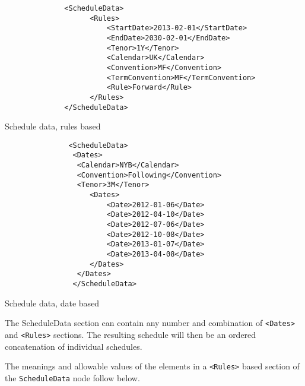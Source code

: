 \begin{listing}[H]
\begin{verbatim}
              <ScheduleData>
                    <Rules>
                        <StartDate>2013-02-01</StartDate>
                        <EndDate>2030-02-01</EndDate>
                        <Tenor>1Y</Tenor>
                        <Calendar>UK</Calendar>
                        <Convention>MF</Convention>
                        <TermConvention>MF</TermConvention>
                        <Rule>Forward</Rule>
                    </Rules>
              </ScheduleData>
\end{verbatim}
\caption{Schedule data, rules based}
\label{lst:schedule_data_true}
\end{listing}

\begin{listing}[H]
\begin{verbatim}
               <ScheduleData>
                <Dates>
                 <Calendar>NYB</Calendar>
                 <Convention>Following</Convention>
                 <Tenor>3M</Tenor>
                    <Dates>
                        <Date>2012-01-06</Date>
                        <Date>2012-04-10</Date>
                        <Date>2012-07-06</Date>
                        <Date>2012-10-08</Date>
                        <Date>2013-01-07</Date>
                        <Date>2013-04-08</Date>
                    </Dates>
                 </Dates> 
                </ScheduleData>
\end{verbatim}
\caption{Schedule data, date based}
\label{lst:schedule_data_false}
\end{listing}

The ScheduleData section can contain any number and combination of
{\tt <Dates>} and {\tt <Rules>} sections. The resulting schedule will
then be an ordered concatenation of individual schedules.
 
\medskip
The meanings and allowable values of the elements in a {\tt <Rules>} based section of the  \lstinline!ScheduleData! node follow below.

